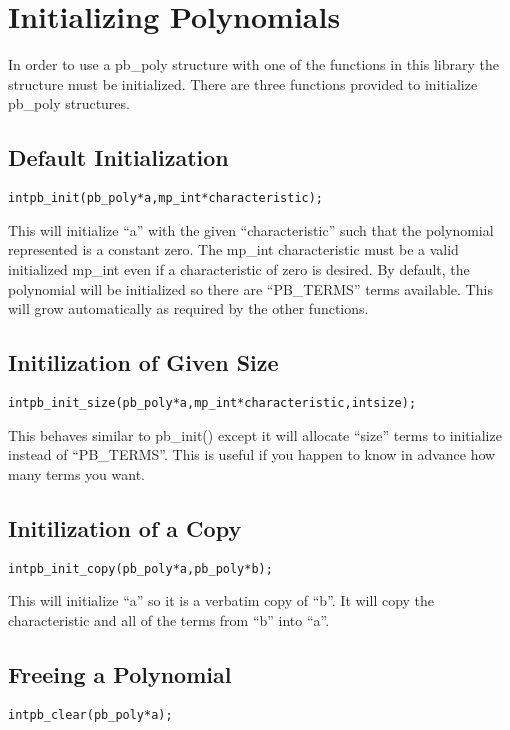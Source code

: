 \documentclass[b5paper]{book}
\begin{document}
\section{Initializing Polynomials}
In order to use a pb\_poly structure with one of the functions in this library the structure must be initialized.  
There are three functions provided to initialize pb\_poly structures.

\subsection{Default Initialization}
\begin{alltt}
int pb_init(pb_poly *a, mp_int *characteristic);
\end{alltt}
This will initialize ``a'' with the given ``characteristic'' such that the polynomial represented is a constant zero.  
The mp\_int characteristic must be a valid initialized mp\_int even if a characteristic of zero is desired.  By default, 
the polynomial will be initialized so there are ``PB\_TERMS'' terms available.  This will grow automatically as required 
by the other functions.

\subsection{Initilization of Given Size}
\begin{alltt}
int pb_init_size(pb_poly *a, mp_int *characteristic, int size);
\end{alltt}
This behaves similar to pb\_init() except it will allocate ``size'' terms to initialize instead of ``PB\_TERMS''.  This
is useful if you happen to know in advance how many terms you want.

\subsection{Initilization of a Copy}
\begin{alltt}
int pb_init_copy(pb_poly *a, pb_poly *b);
\end{alltt}

This will initialize ``a'' so it is a verbatim copy of ``b''.  It will copy the characteristic and all of the terms
from ``b'' into ``a''.

\subsection{Freeing a Polynomial}
\begin{alltt}
int pb_clear(pb_poly *a);
\end{alltt}
\end{document}
